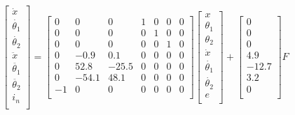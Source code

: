 \documentclass[a4paper, 10pt]{report}
\begin{document}
\begin{equation*}
\begin{bmatrix}
\dot{x} \\
\dot{\theta_{1}}\\
\dot{\theta_{2}}\\
\ddot{x}\\
\ddot{\theta_{1}}\\
\ddot{\theta_{2}}\\
i_{n}\\
\end{bmatrix}
=
\begin{bmatrix}
0 & 0 & 0 & 1 & 0 & 0 & 0 \\
0 & 0 & 0 & 0 & 1 & 0 & 0 \\
0 & 0 & 0 & 0 & 0 & 1 & 0 \\
0 & -0.9 & 0.1 & 0 & 0 & 0 & 0 \\
0 & 52.8 & -25.5 & 0 & 0 & 0 & 0 \\
0 & -54.1 & 48.1 & 0 & 0 & 0 & 0 \\
-1 & 0 & 0 & 0 & 0 & 0 & 0 \\
\end{bmatrix}
\begin{bmatrix}
x \\
\theta_{1}\\
\theta_{2}\\
\dot{x}\\
\dot{\theta_{1}}\\
\dot{\theta_{2}}\\
e\\
\end{bmatrix}
+
\begin{bmatrix}
0 \\
0\\
0\\
4.9\\
-12.7\\
3.2 \\
0\\
\end{bmatrix}
F
\end{equation*}
\end{document}
